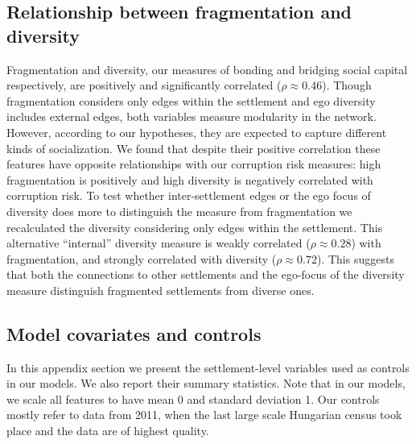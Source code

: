 \subsection{Relationship between fragmentation and diversity}
\label{SI:fragdiv}
Fragmentation and diversity, our measures of bonding and bridging social capital respectively, are positively and significantly correlated ($\rho \approx0.46$). Though fragmentation considers only edges within the settlement and ego diversity includes external edges, both variables measure modularity in the network. However, according to our hypotheses, they are expected to capture different kinds of socialization. We found that despite their positive correlation these features have opposite relationships with our corruption risk measures: high fragmentation is positively and high diversity is negatively correlated with corruption risk. To test whether inter-settlement edges or the ego focus of diversity does more to distinguish the measure from fragmentation we recalculated the diversity considering only edges within the settlement. This alternative ``internal'' diversity measure is weakly correlated ($\rho \approx 0.28$) with fragmentation, and strongly correlated with diversity ($\rho \approx 0.72$). This suggests that both the connections to other settlements and the ego-focus of the diversity measure distinguish fragmented settlements from diverse ones.


\subsection{Model covariates and controls}
\label{appendix:descriptives}

In this appendix section we present the settlement-level variables used as controls in our models. We also report their summary statistics. Note that in our models, we scale all features to have mean 0 and standard deviation 1. Our controls mostly refer to data from 2011, when the last large scale Hungarian census took place and the data are of highest quality. 


